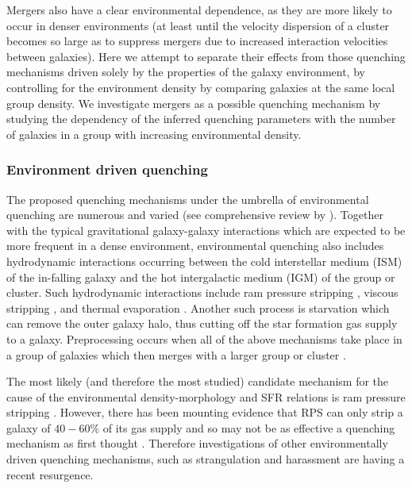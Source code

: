 \documentclass[useAMS,usenatbib]{mn2e}
\def\minor		{\color{minorcol}}
\begin{document}
Mergers also have a clear environmental dependence, as they are more likely to occur in denser environments (at least until the velocity dispersion of a cluster becomes so large as to suppress mergers due to increased interaction velocities between galaxies). {\minor Here we attempt to separate their effects from those quenching mechanisms driven solely by the properties of the galaxy environment, by controlling for the environment density by comparing galaxies at the same local group density.} We investigate mergers as a possible quenching mechanism by studying the dependency of the inferred quenching parameters with the number of galaxies in a group {\minor with increasing environmental density}. 

\subsubsection{Environment driven quenching}\label{sec:envquench}

The proposed quenching mechanisms under the umbrella of environmental quenching are numerous and varied {\minor(see comprehensive review by \citealt{boselli06})}. Together with the typical gravitational galaxy-galaxy interactions \citep{moore96} which are expected to be more frequent in a dense environment, environmental quenching also includes hydrodynamic interactions occurring between the cold interstellar medium (ISM) of the in-falling galaxy and the hot intergalactic medium (IGM) of the group or cluster. Such hydrodynamic interactions include ram pressure stripping \citep{gunngott72}, viscous stripping \citep{nulsen82}, and thermal evaporation \citep[a rapid rise in temperature of the ISM due to contact with the IGM;][]{cowie77}. Another such process is starvation \citep[also called strangulation;][]{larson80} which can remove the outer galaxy halo, thus cutting off the star formation gas supply to a galaxy. Preprocessing occurs when all of the above mechanisms take place in a group of galaxies which then merges with a larger group or cluster \citep{dressler04}. 

The most likely (and therefore the most studied) candidate mechanism for the cause of the environmental density-morphology and SFR relations is ram pressure stripping \citep[RPS;][]{abadi99, poggianti99}. However, there has been mounting evidence that RPS can only strip a galaxy of $40-60\%$ of its gas supply \citep{fillingham16} and so may not be as effective a quenching mechanism as first thought \citep{emerick16}. Therefore investigations of other environmentally driven quenching mechanisms, such as strangulation \citep{peng15, hahn16, maier16, paccagnella16, roberts16, vandevoort16} and harassment \citep[high speed galaxy `fly-by' gravitational interactions][]{bialas15, smith15b} are having a recent resurgence. 
\end{document}
